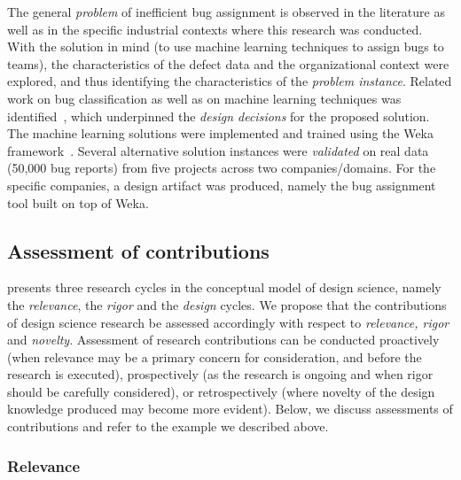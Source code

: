 \documentclass[graybox]{svmult}
\begin{document}
The general \emph{problem} of inefficient bug assignment is observed in the literature as well as in the specific industrial contexts where this research was conducted. With the solution in mind (to use machine learning techniques to assign bugs to teams), the characteristics of the defect data and the organizational context were explored, and thus  identifying the characteristics of the \emph{problem instance}. Related work on bug classification as well as on machine learning techniques was identified~\citep{Borg2013EMSE}, which underpinned the \emph{design decisions} for the proposed solution. The machine learning solutions were implemented and trained using the Weka framework~\citep{hall_weka_2009}. Several alternative solution instances were \emph{validated} on real data (50,000 bug reports) from five projects across two companies/domains. For the specific companies, a design artifact was produced, namely the bug assignment tool built on top of Weka.



\subsection{Assessment of contributions}
\label{sec:assessment}

\cite{Hevner2007} presents three research cycles in the conceptual model of design science, namely the \emph{relevance}, the \emph{rigor} and the \emph{design} cycles. We propose that the contributions of design science research be assessed accordingly with respect to \emph{relevance, rigor} and \emph{novelty}. 
Assessment of research contributions can be conducted proactively (when relevance may be a primary concern for consideration, and before the research is executed), prospectively (as the research is ongoing and when rigor should be carefully considered), or retrospectively (where novelty of the design knowledge produced may become more evident).
Below, we discuss assessments of contributions and refer to the example we described above.




\subsubsection{Relevance} 
\end{document}
